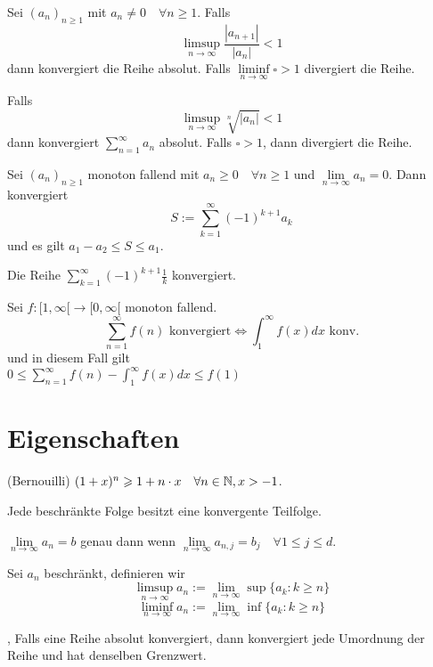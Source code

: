 \Satz[Ratio] Sei $\left(a_{n}\right)_{n \geqslant 1}$ mit $a_{n} \neq 0 \quad \forall n \geqslant 1 .$ Falls 
$$\limsup\limits_{n \rightarrow \infty} \frac{\left|a_{n+1}\right|}{\left|a_{n}\right|}<1$$ dann konvergiert die Reihe absolut.
Falls $\liminf\limits_{n \rightarrow \infty}\square > 1$ divergiert die Reihe.

\Satz[Root] Falls $$\limsup\limits_{n \rightarrow \infty} \sqrt[n]{\left|a_{n}\right|}<1$$ dann konvergiert $\sum_{n=1}^{\infty} a_{n}$ absolut. Falls $\square > 1$, dann divergiert die Reihe.

\Satz[Alternating] Sei $\left(a_{n}\right)_{n \geqslant 1}$ monoton fallend mit $a_{n} \geqslant 0 \quad \forall n \geqslant 1$ und $\lim \limits_{n \rightarrow \infty} a_{n}=0 .$ Dann konvergiert 
$$S:=\sum_{k=1}^{\infty}(-1)^{k+1} a_{k}$$ und es gilt $a_{1}-a_{2} \leqslant S \leqslant a_{1}$.

\Bsp Die Reihe $\sum_{k=1}^{\infty}(-1)^{k+1} \frac{1}{k}$ konvergiert.

\Satz[McLaurin] Sei $f:[1,\infty[ \longrightarrow [0, \infty[$ monoton fallend.
$$ \sum_{n=1}^\infty f(n) \text{ konvergiert} \Longleftrightarrow \int_1^\infty f(x) dx \text{ konv.}$$
und in diesem Fall gilt \\
$ 0 \leq \sum_{n=1}^\infty f(n) - \int_1^\infty f(x) dx \leq f(1)$


\section{Eigenschaften}
\Lemma (Bernouilli) $(1+x)^{n} \geqslant 1+n \cdot x \quad \forall n \in \mathbb{N}, x>-1$.

\Satz[Teilfolge] Jede beschränkte Folge besitzt eine konvergente Teilfolge.

\Satz[Vektorfolge] $\lim \limits_{n \rightarrow \infty} a_{n}=b$ genau dann wenn $\lim \limits_{n \rightarrow \infty} a_{n, j}=b_{j} \quad \forall 1 \leqslant j \leqslant d$.

 Sei $a_n$ beschränkt, definieren wir
$$\limsup\limits_{n \rightarrow \infty} a_n := \lim \limits_{n \rightarrow \infty} \sup \{a_k : k\geqslant n\}$$
$$\liminf\limits_{n \rightarrow \infty} a_n := \lim \limits_{n \rightarrow \infty} \inf \{a_k : k\geqslant n\}$$

\sep
\Satz[Umordnung] Falls eine Reihe absolut konvergiert, dann konvergiert jede
Umordnung der Reihe und hat denselben Grenzwert.

